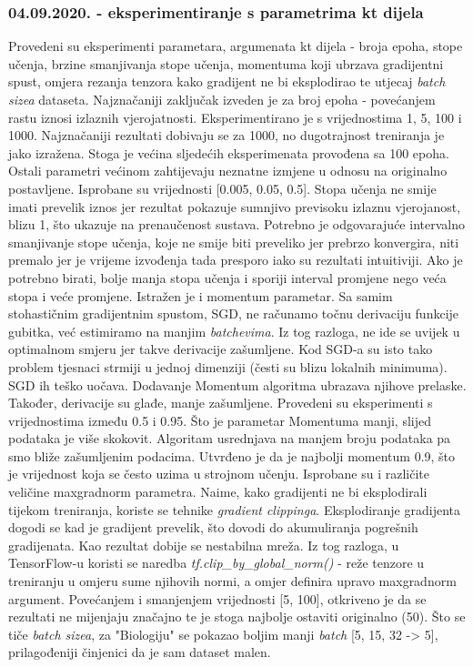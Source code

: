 \subsubsection{04.09.2020. - eksperimentiranje s parametrima kt dijela}
Provedeni su eksperimenti parametara, argumenata kt dijela - broja epoha, stope učenja, brzine smanjivanja stope učenja, momentuma koji ubrzava gradijentni spust, omjera rezanja tenzora kako gradijent ne bi eksplodirao te utjecaj \textit{batch sizea} dataseta.\newline
Najznačaniji zaključak izveden je za broj epoha - povećanjem rastu iznosi izlaznih vjerojatnosti. Eksperimentirano je s vrijednostima 1, 5, 100 i 1000. Najznačaniji rezultati dobivaju se za 1000, no dugotrajnost treniranja je jako izražena. Stoga je većina sljedećih eksperimenata provođena sa 100 epoha. Ostali parametri većinom zahtijevaju neznatne izmjene u odnosu na originalno postavljene.\newline
Isprobane su vrijednosti [0.005, 0.05, 0.5]. Stopa učenja ne smije imati prevelik iznos jer rezultat pokazuje sumnjivo previsoku izlaznu vjerojanost, blizu 1, što ukazuje na prenaučenost sustava. Potrebno je odgovarajuće intervalno smanjivanje stope učenja, koje ne smije biti preveliko jer prebrzo konvergira, niti premalo jer je vrijeme izvođenja tada presporo iako su rezultati intuitiviji. Ako je potrebno birati, bolje manja stopa učenja i sporiji interval promjene nego veća stopa i veće promjene.\newline
Istražen je i momentum parametar. Sa samim stohastičnim gradijentnim spustom, SGD, ne računamo točnu derivaciju funkcije gubitka, već estimiramo na manjim \textit{batchevima}. Iz tog razloga, ne ide se uvijek u optimalnom smjeru jer takve derivacije zašumljene. Kod SGD-a su isto tako problem tjesnaci strmiji u jednoj dimenziji (česti su blizu lokalnih minimuma). SGD ih teško uočava. Dodavanje Momentum algoritma ubrazava njihove prelaske. Također, derivacije su glađe, manje zašumljene. Provedeni su eksperimenti s vrijednostima između 0.5 i 0.95. Što je parametar Momentuma manji, slijed podataka je više skokovit. Algoritam usrednjava na manjem broju podataka pa smo bliže zašumljenim podacima. Utvrđeno je da je najbolji momentum 0.9, što je vrijednost koja se često uzima u strojnom učenju.\newline
Isprobane su i različite veličine maxgradnorm parametra. Naime, kako gradijenti ne bi eksplodirali tijekom treniranja, koriste se tehnike \textit{gradient clippinga}. Eksplodiranje gradijenta dogodi se kad je gradijent prevelik, što dovodi do akumuliranja pogrešnih gradijenata. Kao rezultat dobije se nestabilna mreža. Iz tog razloga, u TensorFlow-u koristi se naredba \textit{tf.clip\_by\_global\_norm()} - reže tenzore u treniranju u omjeru sume njihovih normi, a omjer definira upravo maxgradnorm argument. Povećanjem i smanjenjem vrijednosti [5, 100], otkriveno je da se rezultati ne mijenjaju značajno te je stoga najbolje ostaviti originalno (50). \newline
Što se tiče \textit{batch sizea}, za "Biologiju" se pokazao boljim manji \textit{batch} [5, 15, 32 -> 5], prilagođeniji činjenici da je sam dataset malen. 

